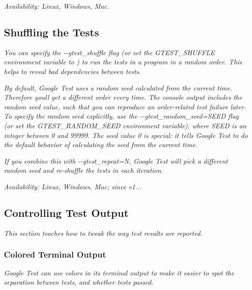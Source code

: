 {\itshape {\itshape Availability\+:} Linux, Windows, Mac.}

{\itshape \subsection*{Shuffling the Tests}}

{\itshape }

{\itshape You can specify the {\ttfamily -\/-\/gtest\+\_\+shuffle} flag (or set the {\ttfamily G\+T\+E\+S\+T\+\_\+\+S\+H\+U\+F\+F\+LE} environment variable to {}) to run the tests in a program in a random order. This helps to reveal bad dependencies between tests.}

{\itshape By default, Google Test uses a random seed calculated from the current time. Therefore you\textquotesingle{}ll get a different order every time. The console output includes the random seed value, such that you can reproduce an order-\/related test failure later. To specify the random seed explicitly, use the {\ttfamily -\/-\/gtest\+\_\+random\+\_\+seed=S\+E\+ED} flag (or set the {\ttfamily G\+T\+E\+S\+T\+\_\+\+R\+A\+N\+D\+O\+M\+\_\+\+S\+E\+ED} environment variable), where {\ttfamily S\+E\+ED} is an integer between 0 and 99999. The seed value 0 is special\+: it tells Google Test to do the default behavior of calculating the seed from the current time.}

{\itshape If you combine this with {\ttfamily -\/-\/gtest\+\_\+repeat=N}, Google Test will pick a different random seed and re-\/shuffle the tests in each iteration.}

{\itshape {\itshape Availability\+:} Linux, Windows, Mac; since v1...}

{\itshape \subsection*{Controlling Test Output}}

{\itshape }

{\itshape This section teaches how to tweak the way test results are reported.}

{\itshape \subsubsection*{Colored Terminal Output}}

{\itshape }

{\itshape Google Test can use colors in its terminal output to make it easier to spot the separation between tests, and whether tests passed.}

